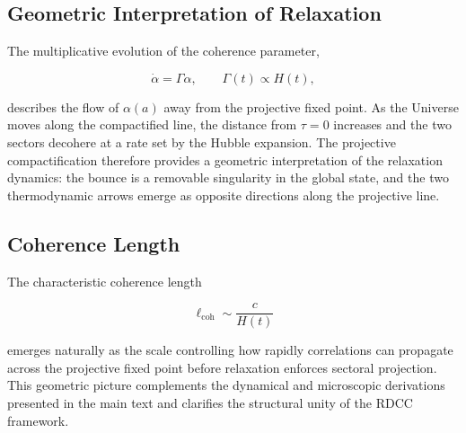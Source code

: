 \documentclass[11pt,a4paper]{article}
\newcommand{\RelaxEq}{\dot{\alpha} = \Gamma \alpha}
\newcommand{\lcoh}{\ell_{\mathrm{coh}}}
\begin{document}
\subsection*{Geometric Interpretation of Relaxation}

The multiplicative evolution of the coherence parameter,


\[
\RelaxEq,
\qquad
\Gamma(t) \propto H(t),
\]


describes the flow of \(\alpha(a)\) away from the projective fixed point. As the
Universe moves along the compactified line, the distance from \(\tau = 0\)
increases and the two sectors decohere at a rate set by the Hubble expansion.
The projective compactification therefore provides a geometric interpretation of
the relaxation dynamics: the bounce is a removable singularity in the global
state, and the two thermodynamic arrows emerge as opposite directions along the
projective line.

\subsection*{Coherence Length}

The characteristic coherence length


\[
\lcoh \sim \frac{c}{H(t)}
\]


emerges naturally as the scale controlling how rapidly correlations can propagate
across the projective fixed point before relaxation enforces sectoral
projection. This geometric picture complements the dynamical and microscopic
derivations presented in the main text and clarifies the structural unity of the
RDCC framework.
\end{document}
